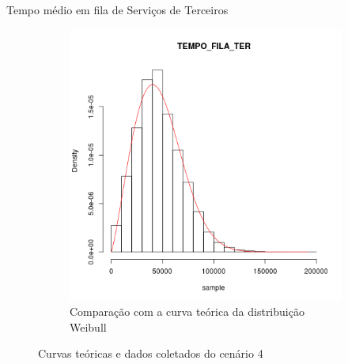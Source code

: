 \documentclass[xcolor=dvipsnames]{beamer}
\begin{document}
\begin{frame}{Tempo médio em fila de Serviços de Terceiros}
\begin{figure}[H]
\begin{subfigure}[H]{0.4\textwidth}
			\includegraphics[width=\textwidth]{img/C4-hist-weibull-TEMPO_FILA_TER.png}
			\caption{Comparação com a curva teórica da distribuição Weibull}
			\label{fig:C4-wei}
		\end{subfigure}
		\caption{Curvas teóricas e dados coletados do cenário 4}
	\end{figure}
\end{frame}
	
\end{document}
